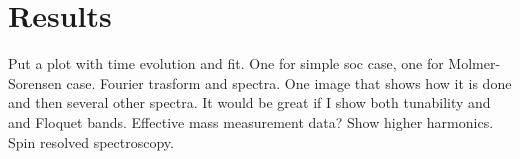 \section{Results}
Put a plot with time evolution and fit. One for simple soc case, one for Molmer-Sorensen case. Fourier trasform and spectra. One image that shows how it is done and then several other spectra. It would be great if I show both tunability and and Floquet bands. Effective mass measurement data? Show higher harmonics. Spin resolved spectroscopy. 

